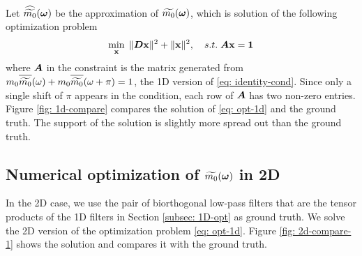 Let $\widehat{\widetilde{m_{0}}}(\boldsymbol{\omega})$ be the approximation of $\widetilde{m_{0}}(\boldsymbol{\omega})$, which is solution of the following optimization problem
\begin{align}
\min_{\mathbf{x}}\; \Vert \boldsymbol{D}\mathbf{x}\Vert^2 + \Vert \mathbf{x}\Vert^2,\quad s.t. \; \boldsymbol{A}\mathbf{x} = \mathbf{1} \label{eq: opt-1d}
\end{align}
where $\boldsymbol{A}$ in the constraint is the matrix generated from $m_0\overlinespace{\widetilde{m_0}}(\omega) + m_0\overlinespace{\widetilde{m_0}}(\omega+\pi) = 1$, the 1D version of \eqref{eq: identity-cond}. Since only a single shift of $\pi$ appears in the condition, each row of $\boldsymbol{A}$ has two non-zero entries. 
Figure \ref{fig: 1d-compare} compares the solution of \eqref{eq: opt-1d} and the ground truth. The support of the solution is slightly more spread out than the ground truth.

\subsection{Numerical optimization of $\widetilde{m_{0}}(\boldsymbol{\omega})$ in 2D}
In the 2D case, we use the pair of biorthogonal low-pass filters that are the tensor products of the 1D filters in Section \ref{subsec: 1D-opt} as ground truth. We solve the 2D version of the optimization problem \eqref{eq: opt-1d}. Figure \ref{fig: 2d-compare-1} shows the solution and compares it with the ground truth. 



